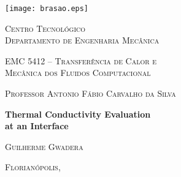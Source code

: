 \begin{titlepage}

\centering
\texttt{[image: brasao.eps]} \par
\textsc{\large{Centro Tecnológico \\ Departamento de Engenharia Mecânica}}
\par
\vspace{1cm}
\textsc{\large{EMC 5412 -- Transferência de Calor e \\ Mecânica dos Fluidos Computacional}}
\par
\vspace{0.25cm}
\textsc{\large{Professor Antonio Fábio Carvalho da Silva}}
\par
\vspace{1.5cm}
\par
\LARGE{\textbf{Thermal Conductivity Evaluation\\at an Interface}}
\par
\vspace{2cm}
\textsc{\large{Guilherme Gwadera}}
\par
\vfill
\textsc{\large{Florianópolis, }}
\par
\end{titlepage}